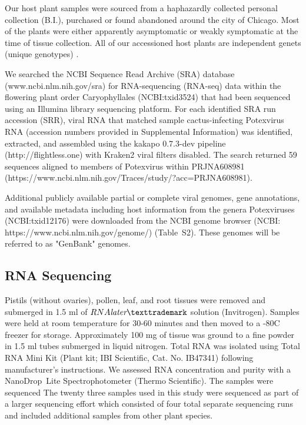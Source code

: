\documentclass[fleqn,10pt,lineno]{wlpeerj}
\begin{document}
Our host plant samples were sourced from a haphazardly collected personal collection (B.I.), purchased or found abandoned around the city of Chicago. 
Most of the plants were either apparently asymptomatic or weakly symptomatic at the time of tissue collection.
All of our accessioned host plants are independent genets (unique genotypes) \citep{ramanauskas2021}.

We searched the NCBI Sequence Read Archive (SRA) database (www.ncbi.nlm.nih.gov/sra) for RNA-sequencing (RNA-seq) data within the flowering plant order Caryophyllales (NCBI:txid3524) that had been sequenced using an Illumina library sequencing platform. 
For each identified SRA run accession (SRR), viral RNA that matched sample cactus-infecting Potexvirus RNA (accession numbers provided in Supplemental Information) was identified, extracted, and assembled using the kakapo 0.7.3-dev pipeline (http://flightless.one) with Kraken2 viral filters disabled. 
The search returned 59 sequences aligned to members of Potexvirus within PRJNA608981 (https://www.ncbi.nlm.nih.gov/Traces/study/?acc=PRJNA608981).


Additional publicly available partial or complete viral genomes, gene annotations, and available metadata including host information from the genera Potexviruses (NCBI:txid12176) were downloaded from the NCBI genome browser (NCBI: https://www.ncbi.nlm.nih.gov/genome/) (Table~S2).
These genomes will be referred to as "GenBank" genomes.

\subsection*{RNA Sequencing}

Pistils (without ovaries), pollen, leaf, and root tissues were removed and submerged in 1.5 ml of $RNA\textit{later}{\texttrademark}$ solution (Invitrogen).
Samples were held at room temperature for 30-60 minutes and then moved to a -80\textdegree C freezer for storage.
Approximately 100 mg of tissue was ground to a fine powder in 1.5 ml tubes submerged in liquid nitrogen.
Total RNA was isolated using Total RNA Mini Kit (Plant kit; IBI Scientific, Cat. No. IB47341) following manufacturer's instructions.
We assessed RNA concentration and purity with a NanoDrop\texttrademark~Lite Spectrophotometer (Thermo Scientific).
The samples were sequenced
The twenty three samples used in this study were sequenced as part of a larger sequencing effort which consisted of four total separate sequencing runs and included additional samples from other plant species. 
\end{document}
